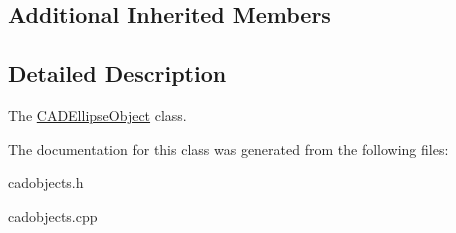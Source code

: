 \subsection*{Additional Inherited Members}


\subsection{Detailed Description}
The \hyperlink{class_c_a_d_ellipse_object}{C\+A\+D\+Ellipse\+Object} class. 

The documentation for this class was generated from the following files\+:\begin{DoxyCompactItemize}
\item 
cadobjects.\+h\item 
cadobjects.\+cpp\end{DoxyCompactItemize}
